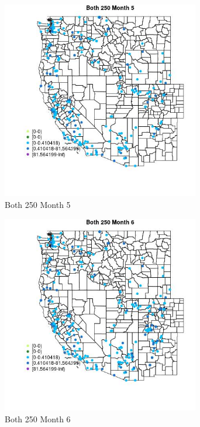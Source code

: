 \begin{figure} 
\centering  
\includegraphics[width=0.77\textwidth]{Code_Outputs/Report_ML_input_PM25_Step4_part_e_de_duplicated_aveswNAs_MapObsMo5Both_250.jpg} 
\caption{\label{fig:Report_ML_input_PM25_Step4_part_e_de_duplicated_aveswNAsMapObsMo5Both_250}Both 250 Month 5} 
\end{figure} 
 

\begin{figure} 
\centering  
\includegraphics[width=0.77\textwidth]{Code_Outputs/Report_ML_input_PM25_Step4_part_e_de_duplicated_aveswNAs_MapObsMo6Both_250.jpg} 
\caption{\label{fig:Report_ML_input_PM25_Step4_part_e_de_duplicated_aveswNAsMapObsMo6Both_250}Both 250 Month 6} 
\end{figure} 
 

